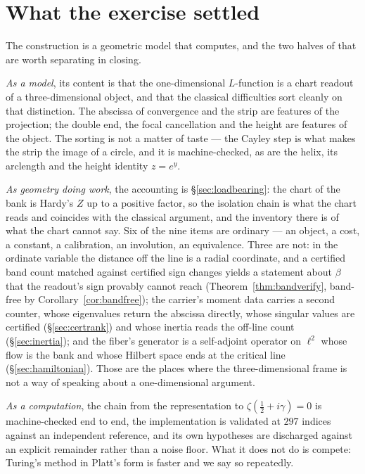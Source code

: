 \documentclass[11pt]{article}
\theoremstyle{plain}
\theoremstyle{definition}
\theoremstyle{remark}
\begin{document}
\section{What the exercise settled}\label{sec:conclusion}

The construction is a geometric model that computes, and the two halves of that are
worth separating in closing.

\emph{As a model}, its content is that the one-dimensional $L$-function is a chart
readout of a three-dimensional object, and that the classical difficulties sort cleanly
on that distinction. The abscissa of convergence and the strip are features of the
projection; the double end, the focal cancellation and the height are features of the
object. The sorting is not a matter of taste --- the Cayley step is what makes the
strip the image of a circle, and it is machine-checked, as are the helix, its arclength
and the height identity $z=e^{y}$.

\emph{As geometry doing work}, the accounting is \S\ref{sec:loadbearing}: the chart of
the bank is Hardy's $Z$ up to a positive factor, so the isolation chain is what the chart
reads and coincides with the classical argument, and the inventory there is of what the
chart cannot say. Six of the nine items are ordinary --- an object, a cost, a constant, a calibration, an involution, an
equivalence. Three are not: in the ordinate variable the distance off the line is a
radial coordinate, and a certified band count matched against certified sign changes
yields a statement about $\beta$ that the readout's sign provably cannot reach
(Theorem~\ref{thm:bandverify}, band-free by Corollary~\ref{cor:bandfree}); the carrier's
moment data carries a second counter, whose eigenvalues return the abscissa directly,
whose singular values are certified (\S\ref{sec:certrank}) and whose inertia reads the
off-line count (\S\ref{sec:inertia}); and the fiber's generator is a self-adjoint operator
on $\ell^2$ whose flow is the bank and whose Hilbert space ends at the critical line
(\S\ref{sec:hamiltonian}). Those are the places where the three-dimensional frame is not a
way of speaking about a one-dimensional argument.

\emph{As a computation}, the chain from the representation to
$\zeta(\tfrac12+i\gamma)=0$ is machine-checked end to end, the implementation is
validated at $297$ indices against an independent reference, and its own hypotheses are
discharged against an explicit remainder rather than a noise floor. What it does not do
is compete: Turing's method in Platt's form is faster and we say so repeatedly.
\end{document}
